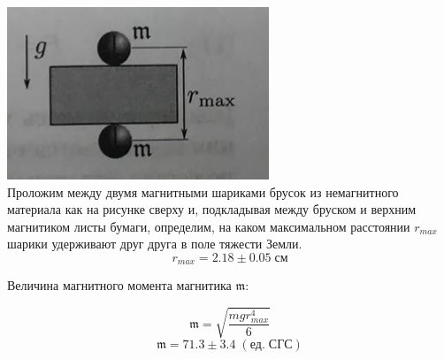 \begin{center}
\begin{minipage}{0.4\textwidth}
 \includegraphics[width=\linewidth]{1.jpg}\\
Проложим между двумя магнитными шариками брусок из немагнитного материала как на рисунке сверху и, подкладывая между бруском и верхним магнитиком листы бумаги, определим, на каком максимальном расстоянии $r_{max}$ шарики удерживают друг друга в поле тяжести Земли. \[r_{max} = 2.18 \pm 0.05 \; {см}\]

Величина магнитного момента магнитика $\mathfrak{m}$:

\[ \mathfrak{m} = \sqrt{\frac{mgr^4_{max}}{6}} \]
\[ \mathfrak{m} = 71.3 \pm 3.4 \; (ед.\; СГС) \]


\end{minipage}
\end{center}
